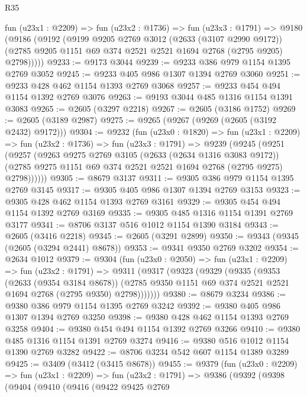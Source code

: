 \begin{lexlean}{R35}
\begin{coremodule}
    fun (u23x1 : @2209) =>
    fun (u23x2 : @1736) =>
    fun (u23x3 : @1791) =>
    @9180
      (@9186
        (@9192
          (@9199
            @9205
            @2769
            @3012
            (@2633 (@3107 @2990 @9172))
            (@2785 @9205 @1151 @69 @374 @2521 @2521 @1694 @2768 (@2795 @9205) @2798)))))
@9233 := @9173 @3044
@9239 := @9233 @386 @979 @1154 @1395 @2769 @3052
@9245 := @9233 @405 @986 @1307 @1394 @2769 @3060
@9251 := @9233 @428 @462 @1154 @1393 @2769 @3068
@9257 := @9233 @454 @494 @1154 @1392 @2769 @3076
@9263 := @9193 @3044 @485 @1316 @1154 @1391 @3083
@9265 := @2605 (@3297 @2218)
@9267 := @2605 (@3186 @1752)
@9269 := @2605 (@3189 @2987)
@9275 := @9265 (@9267 (@9269 (@2605 (@3192 @2432) @9172)))
@9304 := @9232
    (fun (u23x0 : @1820) =>
    fun (u23x1 : @2209) =>
    fun (u23x2 : @1736) =>
    fun (u23x3 : @1791) =>
    @9239
      (@9245
        (@9251
          (@9257
            (@9263
              @9275
              @2769
              @3105
              (@2633 (@2634 @1316 @3083 @9172))
              (@2785 @9275 @1151 @69 @374 @2521 @2521 @1694 @2768 (@2795 @9275) @2798))))))
@9305 := @8679 @3137
@9311 := @9305 @386 @979 @1154 @1395 @2769 @3145
@9317 := @9305 @405 @986 @1307 @1394 @2769 @3153
@9323 := @9305 @428 @462 @1154 @1393 @2769 @3161
@9329 := @9305 @454 @494 @1154 @1392 @2769 @3169
@9335 := @9305 @485 @1316 @1154 @1391 @2769 @3177
@9341 := @8706 @3137 @516 @1012 @1154 @1390 @3184
@9343 := @2605 (@3416 @2218)
@9345 := @2605 (@3291 @2899)
@9350 := @9343 (@9345 (@2605 (@3294 @2441) @8678))
@9353 := @9341 @9350 @2769 @3202
@9354 := @2634 @1012
@9379 := @9304
    (fun (u23x0 : @2050) =>
    fun (u23x1 : @2209) =>
    fun (u23x2 : @1791) =>
    @9311
      (@9317
        (@9323
          (@9329
            (@9335
              (@9353
                (@2633 (@9354 @3184 @8678))
                (@2785 @9350 @1151 @69 @374 @2521 @2521 @1694 @2768 (@2795 @9350) @2798)))))))
@9380 := @8679 @3234
@9386 := @9380 @386 @979 @1154 @1395 @2769 @3242
@9392 := @9380 @405 @986 @1307 @1394 @2769 @3250
@9398 := @9380 @428 @462 @1154 @1393 @2769 @3258
@9404 := @9380 @454 @494 @1154 @1392 @2769 @3266
@9410 := @9380 @485 @1316 @1154 @1391 @2769 @3274
@9416 := @9380 @516 @1012 @1154 @1390 @2769 @3282
@9422 := @8706 @3234 @542 @607 @1154 @1389 @3289
@9425 := @3409 (@3412 (@3415 @8678))
@9455 := @9379
    (fun (u23x0 : @2209) =>
    fun (u23x1 : @2209) =>
    fun (u23x2 : @1791) =>
    @9386
      (@9392
        (@9398
          (@9404
            (@9410
              (@9416
                (@9422
                  @9425
                  @2769

\end{coremodule}
\end{lexlean}
